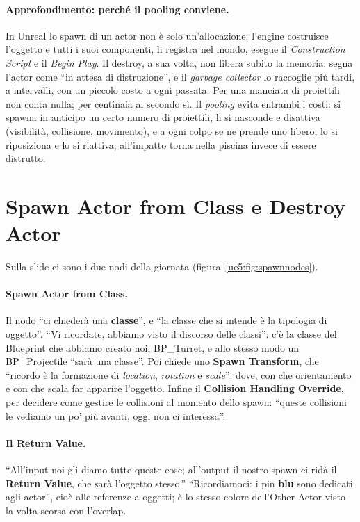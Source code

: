 \paragraph{Approfondimento: perché il pooling conviene.} In Unreal lo spawn di un actor
non è solo un'allocazione: l'engine costruisce l'oggetto e tutti i suoi componenti, li
registra nel mondo, esegue il \emph{Construction Script} e il \emph{Begin Play}. Il
destroy, a sua volta, non libera subito la memoria: segna l'actor come ``in attesa di
distruzione'', e il \emph{garbage collector} lo raccoglie più tardi, a intervalli, con
un piccolo costo a ogni passata. Per una manciata di proiettili non conta nulla; per
centinaia al secondo sì. Il \emph{pooling} evita entrambi i costi: si spawna in anticipo
un certo numero di proiettili, li si nasconde e disattiva (visibilità, collisione,
movimento), e a ogni colpo se ne prende uno libero, lo si riposiziona e lo si
riattiva; all'impatto torna nella piscina invece di essere distrutto.

\section{Spawn Actor from Class e Destroy Actor}
\label{ue5:sec:nodispawn}

Sulla slide ci sono i due nodi della giornata (figura~\ref{ue5:fig:spawnnodes}).

\paragraph{Spawn Actor from Class.} Il nodo ``ci chiederà una \textbf{classe}'', e ``la
classe che si intende è la tipologia di oggetto''. ``Vi ricordate, abbiamo visto il
discorso delle classi'': c'è la classe del Blueprint che abbiamo creato noi,
BP\_Turret, e allo stesso modo un BP\_Projectile ``sarà una classe''. Poi chiede uno
\textbf{Spawn Transform}, che ``ricordo è la formazione di \emph{location},
\emph{rotation} e \emph{scale}'': dove, con che orientamento e con che scala far
apparire l'oggetto. Infine il \textbf{Collision Handling Override}, per decidere come
gestire le collisioni al momento dello spawn: ``queste collisioni le vediamo un po' più
avanti, oggi non ci interessa''.

\paragraph{Il Return Value.} ``All'input noi gli diamo tutte queste cose; all'output il
nostro spawn ci ridà il \textbf{Return Value}, che sarà l'oggetto stesso.'' ``Ricordiamoci:
i pin \textbf{blu} sono dedicati agli actor'', cioè alle referenze a oggetti; è lo stesso
colore dell'Other Actor visto la volta scorsa con l'overlap.

